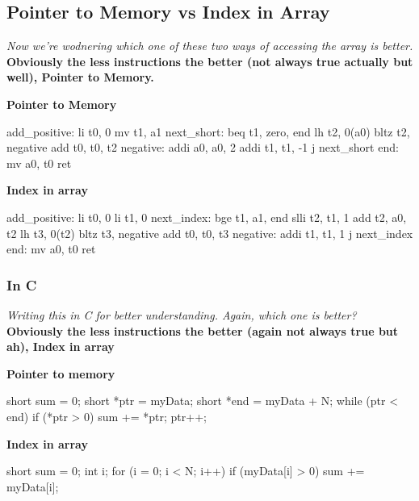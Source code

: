 \subsection{Pointer to Memory vs Index in Array}
\textit{Now we're wodnering which one of these two ways of accessing the array is better.} \\
\textbf{Obviously the less instructions the better (not always true actually but well), Pointer to Memory.} \\
\begin{minipage}[htpb]{0.45\textwidth}
\textbf{Pointer to Memory} \\
\begin{assembly}
add_positive:
    li t0, 0
    mv t1, a1
next_short:
    beq t1, zero, end
    lh t2, 0(a0)
    bltz t2, negative
    add t0, t0, t2
negative:
    addi a0, a0, 2
    addi t1, t1, -1
    j next_short
end:
    mv a0, t0
ret
\end{assembly}
\end{minipage}
\hfill
\vline
\hfill
\begin{minipage}[htp]{0.45\textwidth}
\textbf{Index in array} \\
\begin{assembly}
add_positive:
    li t0, 0
    li t1, 0
next_index:
    bge t1, a1, end
    slli t2, t1, 1
    add t2, a0, t2
    lh t3, 0(t2)
    bltz t3, negative
    add t0, t0, t3
negative:
    addi t1, t1, 1
    j next_index
end:
    mv a0, t0
ret
\end{assembly}
\end{minipage}
\newpage
\subsubsection{In C}
\textit{Writing this in C for better understanding. Again, which one is better?} \\
\vspace*{5px}
\textbf{Obviously the less instructions the better (again not always true but ah), Index in array} \\
\begin{minipage}[htp]{0.45\textwidth}
\textbf{Pointer to memory} \\
\begin{cc}
short sum = 0;
short *ptr = myData;
short *end = myData + N;
while (ptr < end) {
    if (*ptr > 0) {
    sum += *ptr;
}
    ptr++;
}
\end{cc}
\end{minipage}
\hfill
\vline
\hfill
\begin{minipage}[htp]{0.45\textwidth}
\textbf{Index in array} \\
\begin{cc}
short sum = 0;
int i;
for (i = 0; i < N; i++) {
    if (myData[i] > 0) {
    sum += myData[i];
}
}
\end{cc}
\end{minipage}

